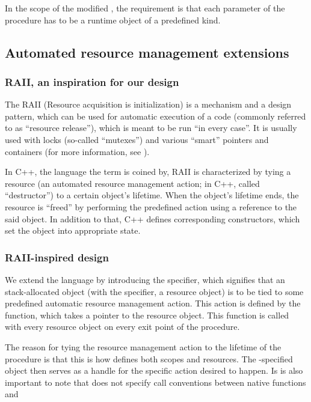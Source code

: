 In the scope of the modified \cmm, the requirement is that each parameter of the  procedure has to be a runtime object of a predefined kind.

\subsection{Automated resource management extensions}
\label{RAII}

\subsubsection{RAII, an inspiration for our design}

The RAII (Resource acquisition is initialization) is a mechanism and a design pattern, which can be used for automatic execution of a code (commonly referred to as ``resource release''), which is meant to be run ``in every case''. It is usually used with locks (so-called ``mutexes'') and various ``smart'' pointers and containers (for more information, see \cite{obiltschnigusing}).

In C++, the language the term is coined by, RAII is characterized by tying a resource (an automated resource management action; in C++, called ``destructor'') to a certain object's lifetime. When the object's lifetime ends, the resource is ``freed'' by performing the predefined action using a reference to the said object. In addition to that, C++ defines corresponding constructors, which set the object into appropriate state.


\subsubsection{RAII-inspired design}

We extend the language by introducing the  specifier, which signifies that an stack-allocated object (with the  specifier, a resource object) is to be tied to some predefined automatic resource management action. This action is defined by the  function, which takes a pointer to the resource object. This function is called with every resource object on every exit point of the procedure.

The reason for tying the resource management action to the lifetime of the procedure is that this is how \cmm defines both scopes and resources. The -specified object then serves as a handle for the specific action desired to happen. Is is also important to note that \cmm does not specify call conventions between native \cmm functions and

